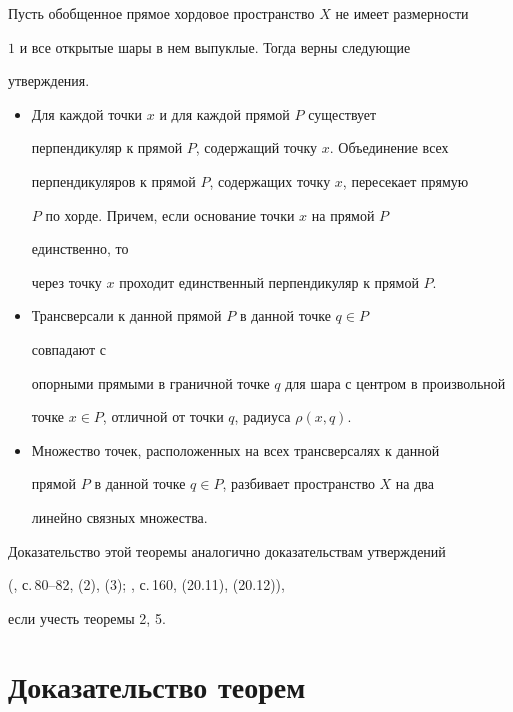 \begin{thm} 


Пусть обобщенное прямое хордовое пространство $X$ не имеет размерности 


$1$ и все открытые шары в нем выпуклые. Тогда верны следующие 


утверждения. 


\begin{itemize}


\item[A.] Для каждой точки $x$ и для каждой прямой $P$ существует 


перпендикуляр к прямой $P$, содержащий точку $x$. Объединение всех 


перпендикуляров к прямой $P$, содержащих точку $x$, пересекает прямую 


$P$ по хорде. Причем, если основание точки $x$ на прямой $P$ 


единственно, то 


через точку $x$ проходит единственный перпендикуляр к прямой $P$. 


\item[B.] Трансверсали к данной прямой $P$ в данной точке $q\in P$ 


совпадают с 


опорными прямыми в граничной точке $q$ для шара с центром в произвольной 


точке $x\in P$, отличной от точки $q$, радиуса $\rho(x,q)$. 


\item[C.] Множество точек, расположенных на всех трансверсалях к данной 


прямой $P$ в данной точке $q\in P$, разбивает пространство $X$ на два 


линейно связных множества. 


\end{itemize}


\end{thm} 


 


Доказательство этой теоремы аналогично доказательствам утверждений 


(\cite{1}, с.\,80--82, (2), (3); \cite{2}, с.\,160, (20.11), (20.12)), 


если учесть теоремы 2, 5. 


 


\section{Доказательство теорем} 


